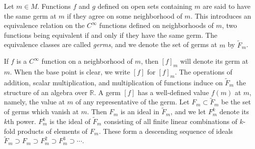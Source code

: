 \begin{definition}\label{thm:1.13}
	Let $m \in M$. Functions $f$ and $g$ defined on open sets containing $m$ are
	said to have the same germ at $m$ if they agree on some neighborhood of $m$.
	This introduces an equivalence relation on the $C^\infty$ functions
	defined on neighborhoods of $m$, two functions being equivalent if and
	only if they have the same germ. The equivalence classes are called
	\emph{germs}, and we denote the set of germs at $m$ by $\widetilde{F}_m$.
\end{definition}

If $f$ is a $C^\infty$ function on a neighborhood of $m$, then $[f]_m$ will denote its germ at $m$. When the base point is clear, we write $[f]$ for $[f]_m$.
The operations of addition, scalar multiplication, and multiplication of
functions induce on $\widetilde{F}_m$ the structure of an algebra over $\mathbb{R}$.
A germ $[f]$ has a well-defined value $f(m)$ at $m$, namely, the value
at $m$ of any representative of the germ. Let $F_m \subset \widetilde{F}_m$
be the set of germs which vanish at $m$. Then $F_m$ is an ideal in $\widetilde{F}_m$,
and we let $F_m^k$ denote its $k$th power. $F_m^k$ is the ideal of $\widetilde{F}_m$
consisting of all finite linear combinations of $k$-fold products of elements of $F_m$.
These form a descending sequence of ideals
$\widetilde{F}_m \supset F_m \supset F_m^{2} \supset F_m^{3} \supset \cdots$.

